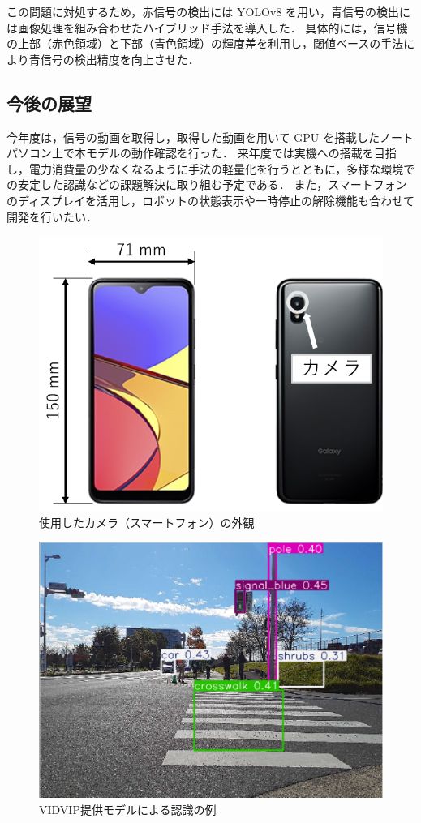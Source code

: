 \documentclass[twocolumn,9pt]{jsproceedings}
\begin{document}
この問題に対処するため，赤信号の検出には YOLOv8 を用い，青信号の検出には画像処理を組み合わせたハイブリッド手法を導入した．
具体的には，信号機の上部（赤色領域）と下部（青色領域）の輝度差を利用し，閾値ベースの手法により青信号の検出精度を向上させた．

\subsection{今後の展望}
今年度は，信号の動画を取得し，取得した動画を用いて GPU を搭載したノートパソコン上で本モデルの動作確認を行った．
来年度では実機への搭載を目指し，電力消費量の少なくなるように手法の軽量化を行うとともに，多様な環境での安定した認識などの課題解決に取り組む予定である．
また，スマートフォンのディスプレイを活用し，ロボットの状態表示や一時停止の解除機能も合わせて開発を行いたい．

\begin{figure}[h]
  \begin{center}
    \includegraphics[width=0.6\linewidth]{figs/smartphone.pdf}
    \caption{使用したカメラ（スマートフォン）の外観}
    \label{fig:smartphone}
  \end{center}
\end{figure}

\begin{figure}[h]
  \begin{center}
    \includegraphics[width=1.0\linewidth]{figs/result_of_yolo.pdf}
    \caption{VIDVIP提供モデルによる認識の例}
    \label{fig:result_yolo}
  \end{center}
\end{figure}
\end{document}
